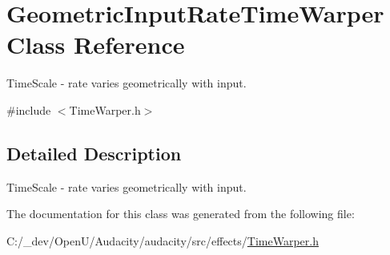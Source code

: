 \hypertarget{class_geometric_input_rate_time_warper}{}\section{Geometric\+Input\+Rate\+Time\+Warper Class Reference}
\label{class_geometric_input_rate_time_warper}


Time\+Scale -\/ rate varies geometrically with input.  




{\ttfamily \#include $<$Time\+Warper.\+h$>$}



\subsection{Detailed Description}
Time\+Scale -\/ rate varies geometrically with input. 

The documentation for this class was generated from the following file\+:\begin{DoxyCompactItemize}
\item 
C\+:/\+\_\+dev/\+Open\+U/\+Audacity/audacity/src/effects/\hyperlink{_time_warper_8h}{Time\+Warper.\+h}\end{DoxyCompactItemize}
